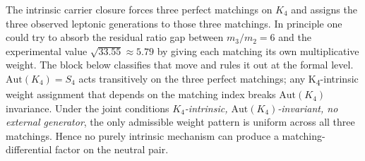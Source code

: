 \documentclass[11pt]{article}
\begin{document}
The intrinsic carrier closure forces three perfect matchings on $K_4$
and assigns the three observed leptonic generations to those three
matchings.  In principle one could try to absorb the residual ratio
gap between $m_3/m_2 = 6$ and the experimental value $\sqrt{33.55}
\approx 5.79$ by giving each matching its own multiplicative weight.
The block below classifies that move and rules it out at the formal
level.  $\mathrm{Aut}(K_4) = S_4$ acts transitively on the three
perfect matchings; any K\textsubscript{4}-intrinsic weight assignment
that depends on the matching index breaks $\mathrm{Aut}(K_4)$
invariance.  Under the joint conditions
\emph{$K_4$-intrinsic, $\mathrm{Aut}(K_4)$-invariant, no external
generator}, the only admissible weight pattern is uniform across all
three matchings.  Hence no purely intrinsic mechanism can produce a
matching-differential factor on the neutral pair.
\end{document}

